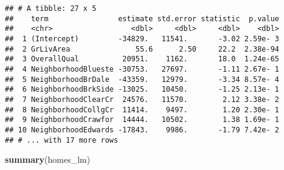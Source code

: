 \documentclass[]{article}
\newenvironment{Shaded}{\begin{snugshade}}{\end{snugshade}}
\newcommand{\KeywordTok}[1]{\textcolor[rgb]{0.13,0.29,0.53}{\textbf{#1}}}
\newcommand{\NormalTok}[1]{#1}
\begin{document}
\begin{verbatim}
## # A tibble: 27 x 5
##    term                estimate std.error statistic  p.value
##    <chr>                  <dbl>     <dbl>     <dbl>    <dbl>
##  1 (Intercept)         -34829.   11541.       -3.02 2.59e- 3
##  2 GrLivArea               55.6      2.50     22.2  2.38e-94
##  3 OverallQual          20951.    1162.       18.0  1.24e-65
##  4 NeighborhoodBlueste -30753.   27697.       -1.11 2.67e- 1
##  5 NeighborhoodBrDale  -43359.   12979.       -3.34 8.57e- 4
##  6 NeighborhoodBrkSide -13025.   10450.       -1.25 2.13e- 1
##  7 NeighborhoodClearCr  24576.   11570.        2.12 3.38e- 2
##  8 NeighborhoodCollgCr  11414.    9497.        1.20 2.30e- 1
##  9 NeighborhoodCrawfor  14444.   10502.        1.38 1.69e- 1
## 10 NeighborhoodEdwards -17843.    9986.       -1.79 7.42e- 2
## # ... with 17 more rows
\end{verbatim}

\begin{Shaded}
\begin{Highlighting}[]
\KeywordTok{summary}\NormalTok{(homes_lm)}
\end{Highlighting}
\end{Shaded}
\end{document}
